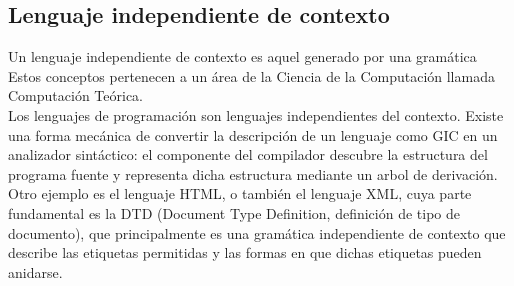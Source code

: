 \documentclass[12pt,a4paper,spanish]{book}
\begin{document}
\subsection{Lenguaje independiente de contexto}
Un lenguaje independiente de contexto es aquel generado por una gram\'atica  Estos conceptos pertenecen a un \'area de la Ciencia de la
Computaci\'on llamada Computaci\'on Te\'orica.\\
Los lenguajes de programaci\'on son lenguajes independientes del contexto. Existe una forma mec\'anica de convertir la descripci\'on de un lenguaje como GIC en un analizador sint\'actico: el componente del compilador descubre la estructura del programa fuente y representa dicha estructura mediante un arbol de derivaci\'on.\\
Otro ejemplo es el lenguaje HTML, o tambi\'en el lenguaje XML, cuya parte fundamental es la DTD (Document Type Definition, definici\'on de tipo de documento), que principalmente es una gram\'atica independiente de contexto que describe las etiquetas permitidas y las formas en que dichas etiquetas pueden anidarse.
\end{document}
